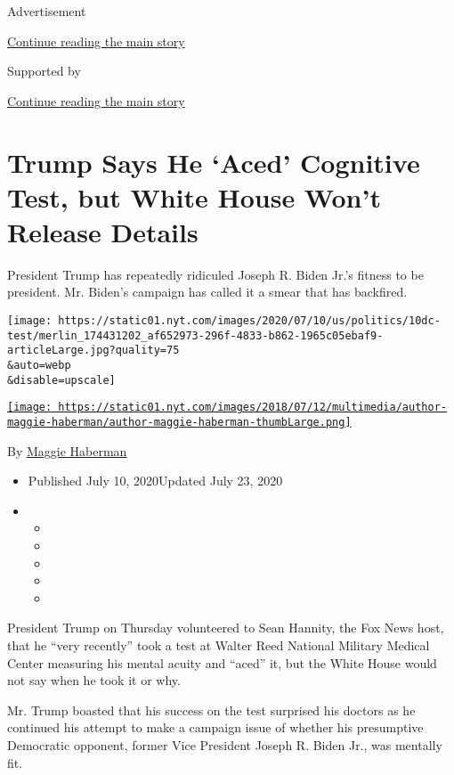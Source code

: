 Advertisement

\protect\hyperlink{after-top}{Continue reading the main story}

Supported by

\protect\hyperlink{after-sponsor}{Continue reading the main story}

\hypertarget{trump-says-he-aced-cognitive-test-but-white-house-wont-release-details}{%
\section{Trump Says He `Aced' Cognitive Test, but White House Won't
Release
Details}\label{trump-says-he-aced-cognitive-test-but-white-house-wont-release-details}}

President Trump has repeatedly ridiculed Joseph R. Biden Jr.'s fitness
to be president. Mr. Biden's campaign has called it a smear that has
backfired.

\texttt{[image: https://static01.nyt.com/images/2020/07/10/us/politics/10dc-test/merlin\_174431202\_af652973-296f-4833-b862-1965c05ebaf9-articleLarge.jpg?quality=75\\\&auto=webp\\\&disable=upscale]}

\href{https://www.nytimes.com/by/maggie-haberman}{\texttt{[image: https://static01.nyt.com/images/2018/07/12/multimedia/author-maggie-haberman/author-maggie-haberman-thumbLarge.png]}}

By \href{https://www.nytimes.com/by/maggie-haberman}{Maggie Haberman}

\begin{itemize}
\item
  Published July 10, 2020Updated July 23, 2020
\item
  \begin{itemize}
  \item
  \item
  \item
  \item
  \item
  \end{itemize}
\end{itemize}

President Trump on Thursday volunteered to Sean Hannity, the Fox News
host, that he ``very recently'' took a test at Walter Reed National
Military Medical Center measuring his mental acuity and ``aced'' it, but
the White House would not say when he took it or why.

Mr. Trump boasted that his success on the test surprised his doctors as
he continued his attempt to make a campaign issue of whether his
presumptive Democratic opponent, former Vice President Joseph R. Biden
Jr., was mentally fit.

